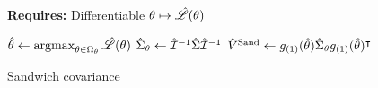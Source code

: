 \begin{figure}
    
    
    \begin{algorithm}[H]
        \caption{Sandwich covariance}
        \textbf{Requires: } Differentiable $\theta \mapsto \hat{\mathscr{L}}(\theta)$
        \begin{algorithmic}
        \State $\hat\theta \gets \operatorname*{\mathrm{argmax}}_{\theta \in \Omega_\theta} \hat{\mathscr{L}}(\theta)$
        \State $\hat{\Sigma}_\theta \gets \hat{\mathcal{I}}^{-1} \hat\Sigma \hat{\mathcal{I}}^{-1}$
        \State \Return $\hat{V}^{\mathrm{Sand}} \gets g_{(1)}(\hat\theta)
            \hat{\Sigma}_\theta g_{(1)}(\hat\theta)^\intercal$
        \end{algorithmic}
    \end{algorithm}
    

\end{figure}
